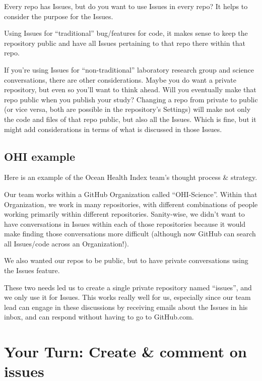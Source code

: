 \documentclass[
  letterpaper,
  DIV=11,
  numbers=noendperiod]{scrreprt}
\begin{document}
Every repo has Issues, but do you want to use Issues in every repo? It
helps to consider the purpose for the Issues.

Using Issues for ``traditional'' bug/features for code, it makes sense
to keep the repository public and have all Issues pertaining to that
repo there within that repo.

If you're using Issues for ``non-traditional'' laboratory research group
and science conversations, there are other considerations. Maybe you do
want a private repository, but even so you'll want to think ahead. Will
you eventually make that repo public when you publish your study?
Changing a repo from private to public (or vice versa, both are possible
in the repository's Settings) will make not only the code and files of
that repo public, but also all the Issues. Which is fine, but it might
add considerations in terms of what is discussed in those Issues.

\hypertarget{ohi-example}{%
\subsection{OHI example}\label{ohi-example}}

Here is an example of the Ocean Health Index team's thought process \&
strategy.

Our team works within a GitHub Organization called ``OHI-Science''.
Within that Organization, we work in many repositories, with different
combinations of people working primarily within different repositories.
Sanity-wise, we didn't want to have conversations in Issues within each
of those repositories because it would make finding those conversations
more difficult (although now GitHub can search all Issues/code across an
Organization!).

We also wanted our repos to be public, but to have private conversations
using the Issues feature.

These two needs led us to create a single private repository named
``issues'', and we only use it for Issues. This works really well for
us, especially since our team lead can engage in these discussions by
receiving emails about the Issues in his inbox, and can respond without
having to go to GitHub.com.

\hypertarget{your-turn-create-comment-on-issues}{%
\section{Your Turn: Create \& comment on
issues}\label{your-turn-create-comment-on-issues}}
\end{document}
